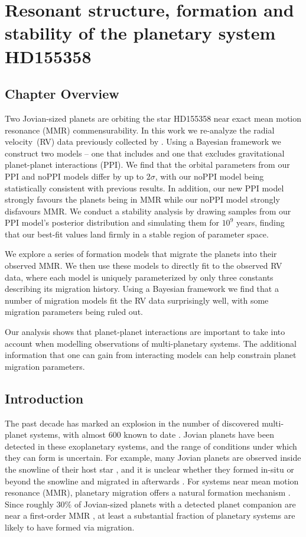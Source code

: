 \chapter[Analysis of HD155358]{Resonant structure, formation and stability of the planetary system HD155358}
\label{chap:HD155358}

\section{Chapter Overview}

Two Jovian-sized planets are orbiting the star HD155358 near exact mean motion resonance (MMR) commensurability. 
In this work we re-analyze the radial velocity~(RV) data previously collected by \citet{Robertson2012}.
Using a Bayesian framework we construct two models -- one that includes and one that excludes gravitational planet-planet interactions (PPI).
We find that the orbital parameters from our PPI and noPPI models differ by up to $2\sigma$, with our noPPI model being statistically consistent with previous results.
In addition, our new PPI model strongly favours the planets being in MMR while our noPPI model strongly disfavours MMR.
We conduct a stability analysis by drawing samples from our PPI model's posterior distribution and simulating them for $10^9$ years, finding that our best-fit values land firmly in a stable region of parameter space.

We explore a series of formation models that migrate the planets into their observed MMR.
We then use these models to directly fit to the observed RV data, where each model is uniquely parameterized by only three constants describing its migration history.
Using a Bayesian framework we find that a number of migration models fit the RV data surprisingly well, with some migration parameters being ruled out.

Our analysis shows that planet-planet interactions are important to take into account when modelling observations of multi-planetary systems.
The additional information that one can gain from interacting models can help constrain planet migration parameters.

\section{Introduction}
\label{sec:intro}
The past decade has marked an explosion in the number of discovered multi-planet systems, with almost 600 known to date \citep{NASAEA}. 
Jovian planets have been detected in these exoplanetary systems, and the range of conditions under which they can form is uncertain.
For example, many Jovian planets are observed inside the snowline of their host star \citep[e.g.][]{Hayashi1981}, and it is unclear whether they formed in-situ \citep{Boley2016, Huang2016, Batygin2016} or beyond the snowline and migrated in afterwards \citep{Mayor1995, Lin1996, Pollack1996}.
For systems near mean motion resonance (MMR), planetary migration offers a natural formation mechanism \citep[e.g.][]{Lee2002, Rein2009}.
Since roughly $30\%$ of Jovian-sized planets with a detected planet companion are near a first-order MMR \citep{NASAEA}, at least a substantial fraction of planetary systems are likely to have formed via migration. 


